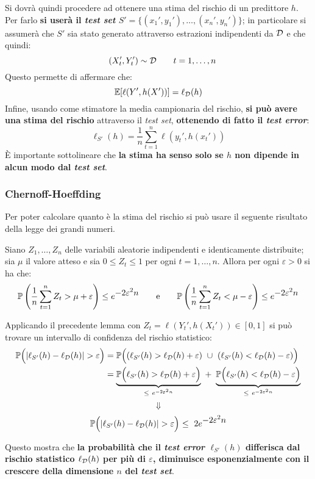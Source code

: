 Si dovrà quindi procedere ad ottenere una stima del rischio di un predittore $h$.
Per farlo 
\textbf{si userà il \textit{test set} $S'=\{(x_1',y_1'),\dots,(x_n',y_n')\}$};
in particolare si assumerà che $S'$ sia stato generato attraverso estrazioni 
indipendenti da $\mathcal{D}$ e che quindi:
\begin{equation}
    \quad (X_t',Y_t') \sim \mathcal{D} \tag*{$t=1,\dots,n$}
\end{equation}
Questo permette di affermare che:
$$ \mathbb{E}[\ell(Y',h(X'))] = \ell_{\mathcal{D}}(h) $$
Infine, usando come stimatore la media campionaria del rischio, \textbf{si può
avere una stima del rischio} attraverso il \textit{test set}, \textbf{ottenendo
di fatto il \textit{test error}}:
$$ \ell_{S'}(h) = \frac{1}{n}\sum_{t=1}^n \ell(y_t',h(x_t')) $$
È importante sottolineare che \textbf{la stima ha senso solo se $h$ non dipende
in alcun modo dal \textit{test set}}.

\subsubsection{Chernoff-Hoeffding}
Per poter calcolare quanto  è la stima del rischio si può usare
il seguente risultato della legge dei grandi numeri.

\begin{lemma}
    Siano $Z_1,\dots,Z_n$ delle variabili aleatorie indipendenti e
    identicamente distribuite; sia $\mu$ il valore atteso e sia $0\leq Z_t\leq1$
    per ogni $t=1,\dots,n$. Allora per ogni $\varepsilon>0$ si ha che:
    $$ \mathbb{P} \left(
        \frac{1}{n}\sum_{t=1}^n Z_t > \mu + \varepsilon
    \right) \leq e^{\displaystyle-2\varepsilon^2n}
    \qquad \text{e} \qquad
    \mathbb{P} \left(
        \frac{1}{n}\sum_{t=1}^n Z_t < \mu - \varepsilon
    \right) \leq e^{\displaystyle-2\varepsilon^2n} $$
\end{lemma}
\vspace{1em}

Applicando il precedente lemma con $Z_t = \ell(Y_t',h(X_t')) \in [0,1]$ si
può trovare un intervallo di confidenza del rischio statistico:
$$\begin{aligned}
    \Prob \Bigl( |\ell_{S'}(h) - \ell_\D(h)| > \varepsilon \Bigl) &= 
        \Prob\Bigl((\ell_{S'}(h) > \ell_\D(h)+\varepsilon) \ \cup \ 
        (\ell_{S'}(h) < \ell_\D(h)-\varepsilon) \Bigl)\\
    &= \underbrace{\Prob\Bigl(\ell_{S'}(h) > \ell_\D(h)+\varepsilon\Bigl)}
        _{\leq \ e^{-2\varepsilon^2n}} \ + \
       \underbrace{\Prob\Bigl(\ell_{S'}(h) < \ell_\D(h)-\varepsilon \Bigl)}
       _{\leq \ e^{-2\varepsilon^2n}}
\end{aligned}$$
$$ \Downarrow $$
$$ \mathbb{P} \Bigl( |\ell_{S'}(h) - \ell_{\mathcal{D}}(h)| > \varepsilon \Bigl) 
 \ \leq \ 2e^{\displaystyle-2\varepsilon^2n} $$

Questo mostra che \textbf{la probabilità che il \textit{test error} 
$\ell_{S'}(h)$ differisca dal rischio statistico $\ell_{\mathcal{D}}(h)$ per più di 
$\varepsilon$, diminuisce esponenzialmente con il crescere della dimensione $n$ 
del \textit{test set}}. 